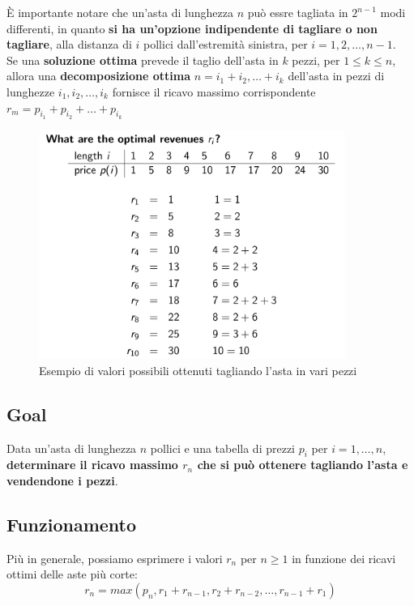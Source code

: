 È importante notare che un'asta di lunghezza $n$ può essre tagliata in
$2^{n-1}$ modi differenti, in quanto \textbf{si ha un'opzione
  indipendente di tagliare o non tagliare}, alla distanza di $i$ pollici
dall'estremità sinistra, per $i = 1, 2, \ldots, n-1$.\\

Se una \textbf{soluzione ottima} prevede il taglio dell'asta in $k$
pezzi, per $1 \le k \le n$, allora una \textbf{decomposizione ottima}
$n = i_1 + i_2, \ldots + i_k$ dell'asta in pezzi di lunghezze
$i_1, i_2, \ldots, i_k$ fornisce il ricavo massimo corrispondente
$r_m = p_{i_1} + p_{i_2} + \ldots + p_{i_k}$

\begin{figure}[H]
\centering
  \includegraphics[width=10cm, keepaspectratio]{Programmazione_dinamica/imgs/pole3.png}
  \caption{Esempio di valori possibili ottenuti tagliando l'asta in vari pezzi}

\end{figure}

\subsection{Goal}

Data un'asta di lunghezza $n$ pollici e una tabella di prezzi $p_i$
per $i = 1, \ldots, n$, \textbf{determinare il ricavo massimo $r_n$ che
  si può ottenere tagliando l'asta e vendendone i pezzi}.

\subsection{Funzionamento}

Più in generale, possiamo esprimere i valori $r_n$ per $n \ge 1$ in
funzione dei ricavi ottimi delle aste più corte:
$$
  r_n = max(p_n, r_1 + r_{n-1}, r_2 + r_{n-2}, \ldots, r_{n-1} + r_1)
$$

